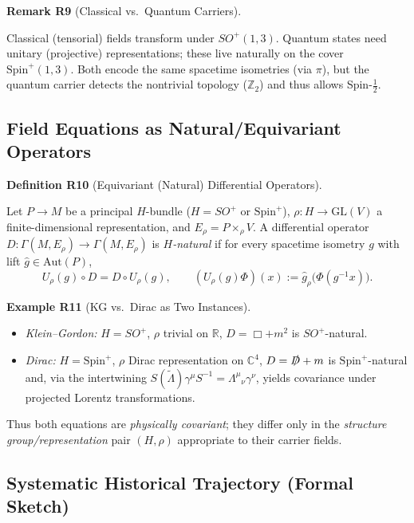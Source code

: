 \documentclass[10pt, letterpaper]{article}
\newcommand{\R}{\mathbb{R}}
\newcommand{\Z}{\mathbb{Z}}
\newcommand{\Aut}{\mathrm{Aut}}
\newcommand{\C}{\mathbb{C}}
\newcommand{\GL}{\mathrm{GL}}
\newcommand{\Spin}{\mathrm{Spin}}
\newcommand{\CustomHeading}[3]{%
  \par\medskip\noindent%
  \textbf{#1 #2} \textnormal{(#3)}.\enskip%
}
\newenvironment{DEF}[2]{\begin{unitbox}\CustomHeading{Definition}{#1}{#2}}{\end{unitbox}}
\newenvironment{REM}[2]{\begin{unitbox}\CustomHeading{Remark}{#1}{#2}}{\end{unitbox}}
\newenvironment{EXA}[2]{\begin{unitbox}\CustomHeading{Example}{#1}{#2}}{\end{unitbox}}
\begin{document}
\begin{REM}{R9}{Classical vs.\ Quantum Carriers}
Classical (tensorial) fields transform under $SO^+(1,3)$. Quantum states need unitary (projective) representations; these live naturally on the cover $\Spin^+(1,3)$. Both encode the same spacetime isometries (via $\pi$), but the quantum carrier detects the nontrivial topology ($\Z_2$) and thus allows Spin-$\tfrac12$.
\end{REM}

\subsection{Field Equations as Natural/Equivariant Operators}

\begin{DEF}{R10}{Equivariant (Natural) Differential Operators}
Let $P\to M$ be a principal $H$-bundle ($H=SO^+$ or $\Spin^+$), $\rho:H\to\GL(V)$ a finite-dimensional representation, and $E_\rho=P\times_\rho V$. A differential operator $D:\Gamma(M,E_\rho)\to\Gamma(M,E_\rho)$ is \emph{$H$-natural} if for every spacetime isometry $g$ with lift $\widehat g\in\Aut(P)$,
\[
U_\rho(g)\circ D = D\circ U_\rho(g),
\qquad (U_\rho(g)\Phi)(x) := \widehat g_\rho\big(\Phi(g^{-1}x)\big).
\]
\end{DEF}

\begin{EXA}{R11}{KG vs.\ Dirac as Two Instances}
\begin{itemize}
\item \emph{Klein--Gordon:} $H=SO^+$, $\rho$ trivial on $\R$, $D=\Box+m^2$ is $SO^+$-natural.
\item \emph{Dirac:} $H=\Spin^+$, $\rho$ Dirac representation on $\C^4$, $D=\slashed D+m$ is $\Spin^+$-natural and, via the intertwining $S(\widetilde\Lambda)\gamma^\mu S^{-1}=\Lambda^\mu{}_\nu\gamma^\nu$, yields covariance under projected Lorentz transformations.
\end{itemize}
Thus both equations are \emph{physically covariant}; they differ only in the \emph{structure group/representation} pair $(H,\rho)$ appropriate to their carrier fields.
\end{EXA}

\subsection{Systematic Historical Trajectory (Formal Sketch)}
\end{document}
